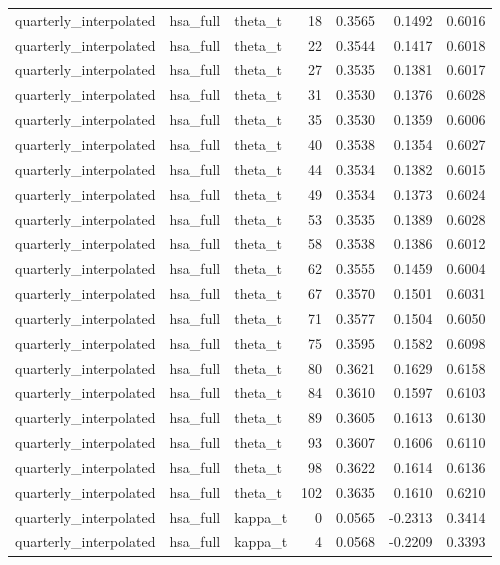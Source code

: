 \begin{tabular}{lllrrrr}
quarterly\_interpolated & hsa\_full & theta\_t & 18 & 0.3565 & 0.1492 & 0.6016 \\
quarterly\_interpolated & hsa\_full & theta\_t & 22 & 0.3544 & 0.1417 & 0.6018 \\
quarterly\_interpolated & hsa\_full & theta\_t & 27 & 0.3535 & 0.1381 & 0.6017 \\
quarterly\_interpolated & hsa\_full & theta\_t & 31 & 0.3530 & 0.1376 & 0.6028 \\
quarterly\_interpolated & hsa\_full & theta\_t & 35 & 0.3530 & 0.1359 & 0.6006 \\
quarterly\_interpolated & hsa\_full & theta\_t & 40 & 0.3538 & 0.1354 & 0.6027 \\
quarterly\_interpolated & hsa\_full & theta\_t & 44 & 0.3534 & 0.1382 & 0.6015 \\
quarterly\_interpolated & hsa\_full & theta\_t & 49 & 0.3534 & 0.1373 & 0.6024 \\
quarterly\_interpolated & hsa\_full & theta\_t & 53 & 0.3535 & 0.1389 & 0.6028 \\
quarterly\_interpolated & hsa\_full & theta\_t & 58 & 0.3538 & 0.1386 & 0.6012 \\
quarterly\_interpolated & hsa\_full & theta\_t & 62 & 0.3555 & 0.1459 & 0.6004 \\
quarterly\_interpolated & hsa\_full & theta\_t & 67 & 0.3570 & 0.1501 & 0.6031 \\
quarterly\_interpolated & hsa\_full & theta\_t & 71 & 0.3577 & 0.1504 & 0.6050 \\
quarterly\_interpolated & hsa\_full & theta\_t & 75 & 0.3595 & 0.1582 & 0.6098 \\
quarterly\_interpolated & hsa\_full & theta\_t & 80 & 0.3621 & 0.1629 & 0.6158 \\
quarterly\_interpolated & hsa\_full & theta\_t & 84 & 0.3610 & 0.1597 & 0.6103 \\
quarterly\_interpolated & hsa\_full & theta\_t & 89 & 0.3605 & 0.1613 & 0.6130 \\
quarterly\_interpolated & hsa\_full & theta\_t & 93 & 0.3607 & 0.1606 & 0.6110 \\
quarterly\_interpolated & hsa\_full & theta\_t & 98 & 0.3622 & 0.1614 & 0.6136 \\
quarterly\_interpolated & hsa\_full & theta\_t & 102 & 0.3635 & 0.1610 & 0.6210 \\
quarterly\_interpolated & hsa\_full & kappa\_t & 0 & 0.0565 & -0.2313 & 0.3414 \\
quarterly\_interpolated & hsa\_full & kappa\_t & 4 & 0.0568 & -0.2209 & 0.3393 \\

\end{tabular}
